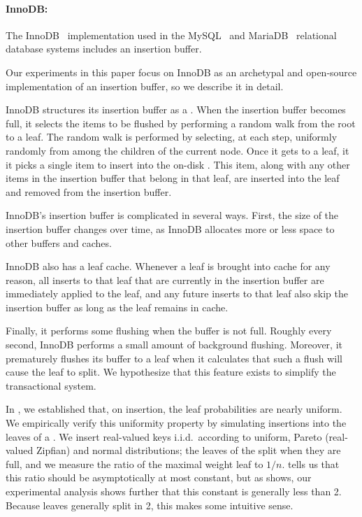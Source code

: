 \paragraph{InnoDB:}  The InnoDB~\cite{Oracle17a} \btree{} implementation used
in the MySQL~\cite{Oracle17b} and MariaDB~\cite{Foundation17} relational
database systems includes an insertion buffer.

Our experiments in this paper focus on InnoDB as an archetypal and open-source
implementation of an insertion buffer, so we describe it in detail.

InnoDB structures its insertion buffer as a \btree{}.  When the insertion
buffer becomes full, it selects the items to be flushed by performing a random
walk from the root to a leaf.  The random walk is performed by selecting, at
each step, uniformly randomly from among the children of the current node.
Once it gets to a leaf, it it picks a single item to insert into the on-disk
\btree{}.  This item, along with any other items in the insertion buffer that
belong in that leaf, are inserted into the leaf and removed from the insertion
buffer.

InnoDB's insertion buffer is complicated in several ways.  First, the size of
the insertion buffer changes over time, as InnoDB allocates more or less space
to other buffers and caches.

InnoDB also has a leaf cache.  Whenever a leaf is brought into cache for any
reason, all inserts to that leaf that are currently in the insertion buffer are
immediately applied to the leaf, and any future inserts to that leaf also skip
the insertion buffer as long as the leaf remains in cache.

Finally, it performs some flushing when the buffer is not full. Roughly every
second, InnoDB performs a small amount of background flushing. Moreover, it
prematurely flushes its buffer to a leaf when it calculates that such a flush
will cause the leaf to split. We hypothesize that this feature exists to
simplify the transactional system.

In , we established that, on insertion, the leaf
probabilities are nearly uniform.  We empirically verify this uniformity
property by simulating insertions into the leaves of a \btree{}. We insert
real-valued keys i.i.d.\ according to uniform, Pareto (real-valued Zipfian) and
normal distributions; the leaves of the \btree{} split when they are full, and
we measure the ratio of the maximal weight leaf to $1/n$.
 tells us that this ratio should be asymptotically at
most constant, but as  shows, our experimental analysis
shows further that this constant is generally less than 2. Because leaves
generally split in 2, this makes some intuitive sense.

